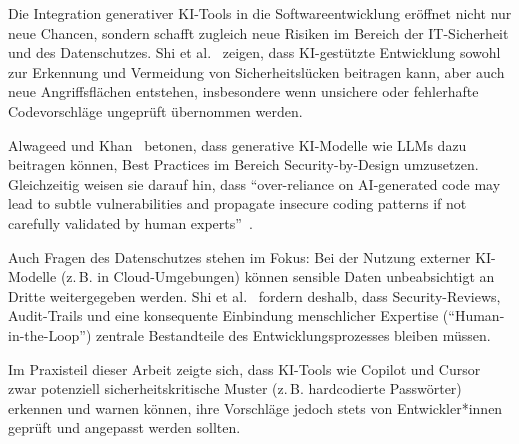Die Integration generativer KI-Tools in die Softwareentwicklung eröffnet nicht
nur neue Chancen, sondern schafft zugleich neue Risiken im Bereich der
IT-Sicherheit und des Datenschutzes. Shi et al.~\cite{shi_ai-assisted_2023}
zeigen, dass KI-gestützte Entwicklung sowohl zur Erkennung und Vermeidung von
Sicherheitslücken beitragen kann, aber auch neue Angriffsflächen entstehen,
insbesondere wenn unsichere oder fehlerhafte Codevorschläge ungeprüft
übernommen werden.

Alwageed und Khan~\cite{alwageed_role_nodate} betonen, dass generative
KI-Modelle wie LLMs dazu beitragen können, Best Practices im Bereich
Security-by-Design umzusetzen. Gleichzeitig weisen sie darauf hin, dass
\enquote{over-reliance on AI-generated code may lead to subtle vulnerabilities
    and propagate insecure coding patterns if not carefully validated by human
    experts}~\cite[S.~9]{alwageed_role_nodate}.

Auch Fragen des Datenschutzes stehen im Fokus: Bei der Nutzung externer
KI-Modelle (z.\,B. in Cloud-Umgebungen) können sensible Daten unbeabsichtigt an
Dritte weitergegeben werden. Shi et al.~\cite{shi_ai-assisted_2023} fordern
deshalb, dass Security-Reviews, Audit-Trails und eine konsequente Einbindung
menschlicher Expertise (\enquote{Human-in-the-Loop}) zentrale Bestandteile des
Entwicklungsprozesses bleiben müssen.

Im Praxisteil dieser Arbeit zeigte sich, dass KI-Tools wie Copilot und Cursor
zwar potenziell sicherheitskritische Muster (z.\,B. hardcodierte Passwörter)
erkennen und warnen können, ihre Vorschläge jedoch stets von Entwickler*innen
geprüft und angepasst werden sollten.
